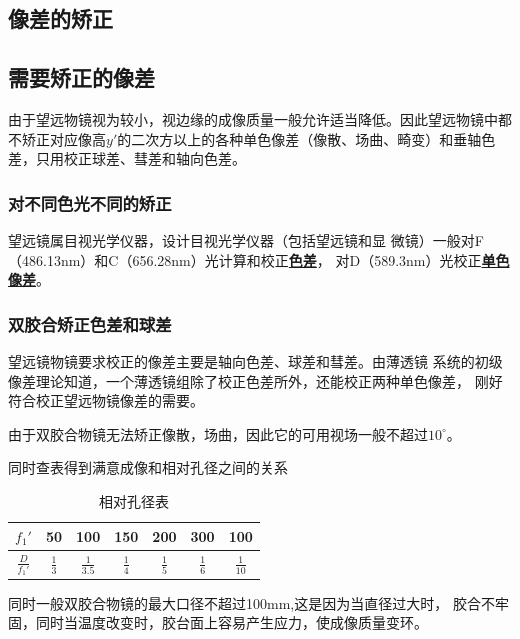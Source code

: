 \documentclass{article}
\begin{document}
\subsection{像差的矫正}

\subsection{需要矫正的像差}
由于望远物镜视为较小，视边缘的成像质量一般允许适当降低。因此望远物镜中都不矫正对应像高$y'$的二次方以上的各种单色像差（像散、场曲、畸变）和垂轴色差，只用校正球差、彗差和轴向色差。
\subsubsection{对不同色光不同的矫正}
望远镜属目视光学仪器，设计目视光学仪器（包括望远镜和显
微镜）一般对F（486.13nm）和C（656.28nm）光计算和校正\textbf{\underline{色差}}，
对D（589.3nm）光校正\underline{\textbf{单色像差}}。

\subsubsection{双胶合矫正色差和球差}
望远镜物镜要求校正的像差主要是轴向色差、球差和彗差。由薄透镜
系统的初级像差理论知道，一个薄透镜组除了校正色差所外，还能校正两种单色像差，
刚好符合校正望远物镜像差的需要。

由于双胶合物镜无法矫正像散，场曲，因此它的可用视场一般不超过$10^{\circ}$。

同时查表得到满意成像和相对孔径之间的关系
% 
\begin{table}[H]
  \centering
  \begin{tabular}{|c|cccccc|}
  \hline
  $f_1'$&50&100&150&200&300&100\\ \hline
  $ \frac{D}{f_1'}$ 
  &$ \frac{1}{3}$
  &$ \frac{1}{3.5}$
  &$ \frac{1}{4}$
  &$ \frac{1}{5}$
  &$ \frac{1}{6}$
  &$ \frac{1}{10}$\\ \hline
  \end{tabular}
  \caption{相对孔径表}
  \end{table}


同时一般双胶合物镜的最大口径不超过100mm,这是因为当直径过大时，
胶合不牢固，同时当温度改变时，胶台面上容易产生应力，使成像质量变环。
\end{document}
